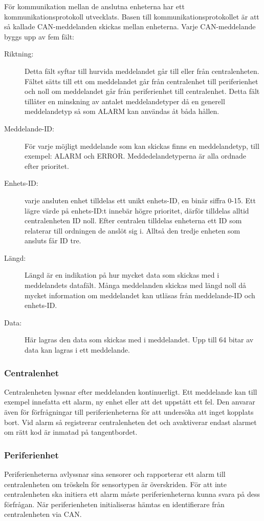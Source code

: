 \documentclass[a4paper]{article}
\begin{document}
För kommunikation mellan de anslutna enheterna har ett kommunikationsprotokoll utvecklats. Basen till kommunikationsprotokollet är att så kallade CAN-meddelanden skickas mellan enheterna. Varje CAN-meddelande byggs upp av fem fält:
\begin{description}
    \item[Riktning:] Detta fält syftar till hurvida meddelandet går till eller från centralenheten. Fältet sätts till ett om meddelandet går från centralenhet till periferienhet och noll om meddelandet går från periferienhet till centralenhet. Detta fält tillåter en minskning av antalet meddelandetyper då en generell meddelandetyp så som ALARM kan användas åt båda hållen.
    \item[Meddelande-ID:] För varje möjligt meddelande som kan skickas finns en meddelandetyp, till exempel: ALARM och ERROR. Meddedelandetyperna är alla ordnade efter prioritet.
    \item[Enhets-ID:] varje ansluten enhet tilldelas ett unikt enhets-ID, en binär siffra 0-15. Ett lägre värde på enhets-ID:t innebär högre prioritet, därför tilldelas alltid centralenheten ID noll. Efter centralen tilldelas enheterna ett ID som relaterar till ordningen de anslöt sig i. Alltså den tredje enheten som ansluts får ID tre.
    \item[Längd:] Längd är en indikation på hur mycket data som skickas med i meddelandets datafält. Många meddelanden skickas med längd noll då mycket information om meddelandet kan utläsas från meddelande-ID och enhets-ID.
    \item[Data:] Här lagras den data som skickas med i meddelandet. Upp till 64 bitar av data kan lagras i ett meddelande.
\end{description}

\subsubsection{Centralenhet}
Centralenheten lyssnar efter meddelanden kontinuerligt.
Ett meddelande kan till exempel innefatta ett alarm, ny enhet eller att det uppstått ett fel.
Den anvarar även för förfrågningar till periferienheterna för att undersöka att inget kopplats bort.
Vid alarm så registrerar centralenheten det och avaktiverar endast alarmet om rätt kod är inmatad på tangentbordet.

\subsubsection{Periferienhet}
Periferienheterna avlyssnar sina sensorer och rapporterar ett alarm till centralenheten om tröskeln för sensortypen är överskriden.
För att inte centralenheten ska initiera ett alarm måste periferienheterna kunna svara på dess förfrågan.
När periferienheten initialiseras hämtas en identifierare från centralenheten via CAN.
\end{document}
